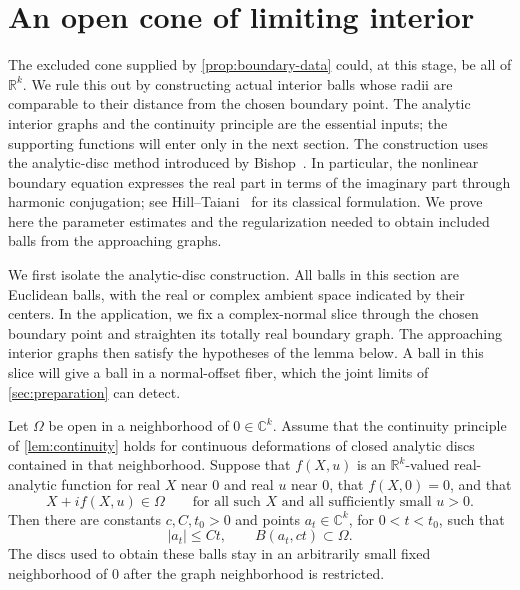 \section{An open cone of limiting interior}\label{sec:noncollapse}

The excluded cone supplied by \cref{prop:boundary-data} could, at this stage, be all of $\mathbb{R}^k$.  We rule this out by constructing actual interior balls whose radii are comparable to their distance from the chosen boundary point.  The analytic interior graphs and the continuity principle are the essential inputs; the supporting functions will enter only in the next section. The construction uses the analytic-disc method introduced by Bishop~\cite{Bishop1965}. In particular, the nonlinear boundary equation expresses the real part in terms of the imaginary part through harmonic conjugation; see Hill--Taiani~\cite[Section~2, Equation~(2.1) and Proposition~2.1, pp.~330--331]{HillTaiani1978} for its classical formulation. We prove here the parameter estimates and the regularization needed to obtain included balls from the approaching graphs.

We first isolate the analytic-disc construction.  All balls in this section are Euclidean balls, with the real or complex ambient space indicated by their centers.  In the application, we fix a complex-normal slice through the chosen boundary point and straighten its totally real boundary graph. The approaching interior graphs then satisfy the hypotheses of the lemma below.  A ball in this slice will give a ball in a normal-offset fiber, which the joint limits of \cref{sec:preparation} can detect.

\begin{lemma}\label{lem:disc-family}
Let $\Omega$ be open in a neighborhood of $0\in\mathbb{C}^k$.  Assume that the continuity principle of \cref{lem:continuity} holds for continuous deformations of closed analytic discs contained in that neighborhood. Suppose that $f(X,u)$ is an $\mathbb{R}^k$-valued real-analytic function for real $X$ near $0$ and real $u$ near $0$, that $f(X,0)=0$, and that
\[
 X+i f(X,u)\in\Omega
 \qquad\text{for all such $X$ and all sufficiently small $u>0$.}
\]
Then there are constants $c,C,t_0>0$ and points $a_t\in\mathbb{C}^k$, for $0<t<t_0$, such that
\begin{equation}\label{eq:disc-balls}
 |a_t|\le Ct,
 \qquad B(a_t,ct)\subset\Omega.
\end{equation}
The discs used to obtain these balls stay in an arbitrarily small fixed neighborhood of $0$ after the graph neighborhood is restricted.
\end{lemma}

